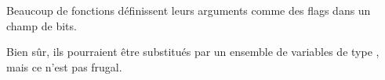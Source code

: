 \section{\BitfieldsChapter}
\label{sec:bitfields}

Beaucoup de fonctions définissent leurs arguments comme des flags dans un champ
de bits.

Bien sûr, ils pourraient être substitués par un ensemble de variables de type \Tbool,
mais ce n'est pas frugal.








